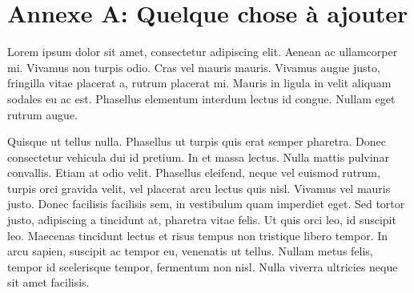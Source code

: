 \chapter*{Annexe A: Quelque chose à ajouter}

Lorem ipsum dolor sit amet, consectetur adipiscing elit. Aenean ac
ullamcorper mi. Vivamus non turpis odio. Cras vel mauris mauris. Vivamus
augue justo, fringilla vitae placerat a, rutrum placerat mi. Mauris in
ligula in velit aliquam sodales eu ac est. Phasellus elementum interdum
lectus id congue. Nullam eget rutrum augue.

Quisque ut tellus nulla. Phasellus ut turpis quis erat semper pharetra.
Donec consectetur vehicula dui id pretium. In et massa lectus. Nulla mattis
pulvinar convallis. Etiam at odio velit. Phasellus eleifend, neque vel
euismod rutrum, turpis orci gravida velit, vel placerat arcu lectus quis
nisl. Vivamus vel mauris justo. Donec facilisis facilisis sem, in vestibulum
quam imperdiet eget. Sed tortor justo, adipiscing a tincidunt at, pharetra
vitae felis. Ut quis orci leo, id suscipit leo. Maecenas tincidunt lectus et
risus tempus non tristique libero tempor. In arcu sapien, suscipit ac tempor
eu, venenatis ut tellus. Nullam metus felis, tempor id scelerisque tempor,
fermentum non nisl. Nulla viverra ultricies neque sit amet facilisis.